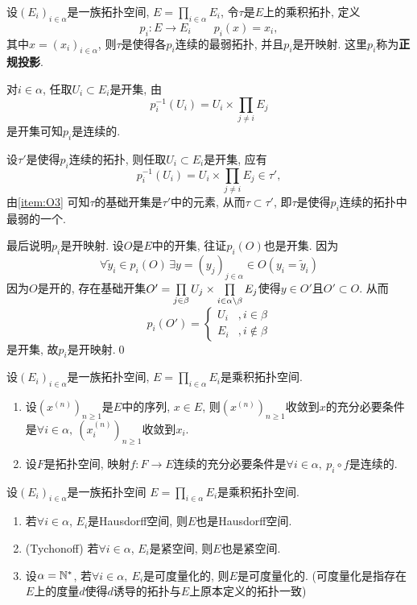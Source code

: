 	\begin{Theorem}
	设$ (E_i)_{i\in\alpha} $是一族拓扑空间, $ E=\prod_{i\in\alpha}E_i $, 令$ \tau $是$ E $上的乘积拓扑, 定义
	\[
	p_i : E\to E_i\qquad p_i(x)=x_i,
	\]
	其中$ x=(x_i)_{i\in\alpha} $, 则$ \tau $是使得各$ p_i $连续的最弱拓扑, 并且$ p_i $是开映射. 这里$ p_i $称为\textbf{正规投影}.
	\end{Theorem}
	\begin{Proof}
	对$ i\in\alpha $, 任取$ U_i\subset E_i $是开集, 由
	\[
	p_i^{-1}(U_i)=U_i\times\prod_{j\ne i}E_j
	\]
	是开集可知$ p_i $是连续的.

	设$ \tau' $是使得$ p_i $连续的拓扑, 则任取$ U_i\subset E_i $是开集, 应有
	\[
	p_i^{-1}(U_i)=U_i\times\prod_{j\ne i}E_j\in\tau',
	\]
	由\ref{item:O3} 可知$ \tau $的基础开集是$ \tau' $中的元素, 从而$ \tau\subset\tau' $, 即$ \tau $是使得$ p_i $连续的拓扑中最弱的一个.

	最后说明$ p_i $是开映射. 设$ O $是$ E $中的开集, 往证$ p_i(O) $也是开集. 因为
	\[
	\forall \tilde{y}_i\in p_i(O)\,\exists y=(y_j)_{j\in\alpha}\in O(y_i=\tilde{y}_i)
	\]
	因为$ O $是开的, 存在基础开集$ O'=\prod\limits_{j\in\beta}U_j\times\prod\limits_{i\in\alpha\setminus\beta}E_j $使得$ y\in O' $且$ O'\subset O $. 从而
	\[
	p_i(O')=\begin{cases}
	U_i & ,i\in\beta\\ E_i &, i\notin\beta
	\end{cases}
	\]
	是开集, 故$ p_i $是开映射.\qed
	\end{Proof}

	\begin{Corollary}
	设$ (E_i)_{i\in\alpha} $是一族拓扑空间, $ E=\prod\limits_{i\in\alpha}E_i $是乘积拓扑空间.
	\begin{enumerate}[(1)]
	\item 设$ (x^{(n)})_{n\geqslant 1} $是$ E $中的序列, $ x\in E $, 则$ (x^{(n)})_{n\geqslant 1} $收敛到$ x $的充分必要条件是$\forall i\in\alpha,\  (x_i^{(n)})_{n\geqslant 1} $收敛到$ x_i $.

	\item 设$ F $是拓扑空间, 映射$ f : F\to E $连续的充分必要条件是$ \forall i\in\alpha,\ p_i\circ f $是连续的.
	\end{enumerate}
	\end{Corollary}

	\begin{Proposition}\label{prop:乘积拓扑空间的继承性质}
	设$ (E_i)_{i\in\alpha} $是一族拓扑空间 $ E=\prod\limits_{i\in\alpha}E_i $是乘积拓扑空间.
	\begin{enumerate}[(1)]
	\item 若$ \forall i\in\alpha $, $ E_i $是Hausdorff空间, 则$ E $也是Hausdorff空间.

	\item (Tychonoff) 若$ \forall i\in\alpha $, $ E_i $是紧空间, 则$ E $也是紧空间.

	\item 设$ \alpha=\mathbb{N}^\ast $, 若$ \forall i\in\alpha,\ E_i $是可度量化的, 则$ E $是可度量化的. (可度量化是指存在$ E $上的度量$ d $使得$ d $诱导的拓扑与$ E $上原本定义的拓扑一致)
	\end{enumerate}
	\end{Proposition}

